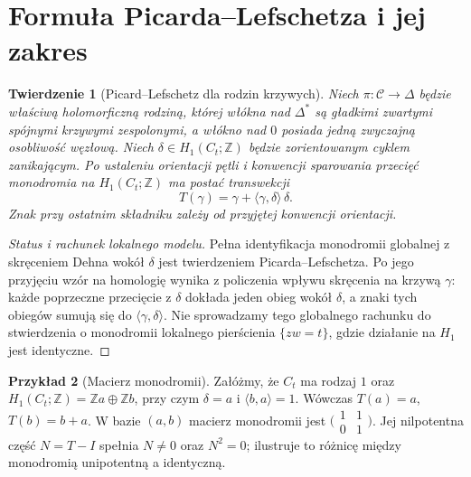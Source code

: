 \documentclass[11pt,a4paper,oneside]{report}
\newcommand{\Z}{\mathbb{Z}}
\theoremstyle{plain}
\newtheorem{twierdzenie}{Twierdzenie}[section]
\theoremstyle{definition}
\newtheorem{przyklad}[twierdzenie]{Przykład}
\theoremstyle{remark}
\begin{document}
\section{Formuła Picarda--Lefschetza i jej zakres}
\begin{twierdzenie}[Picard--Lefschetz dla rodzin krzywych]
\label{thm:picard-lefschetz-xiv}
Niech $\pi:\mathcal C\to\Delta$ będzie właściwą
holomorficzną rodziną, której włókna nad
$\Delta^*$ są gładkimi zwartymi spójnymi
krzywymi zespolonymi, a włókno nad $0$ posiada
jedną zwyczajną osobliwość węzłową.
Niech $\delta\in H_1(C_t;\Z)$ będzie
zorientowanym cyklem zanikającym.
Po ustaleniu orientacji pętli i konwencji
sparowania przecięć monodromia na $H_1(C_t;\Z)$
ma postać transwekcji
\[
T(\gamma)=\gamma+\langle\gamma,\delta\rangle\,\delta.
\]
Znak przy ostatnim składniku zależy od
przyjętej konwencji orientacji.
\end{twierdzenie}
\begin{proof}[Status i rachunek lokalnego modelu]
Pełna identyfikacja monodromii globalnej z
skręceniem Dehna wokół $\delta$ jest twierdzeniem
Picarda--Lefschetza. Po jego przyjęciu wzór na
homologię wynika z policzenia wpływu skręcenia
na krzywą $\gamma$: każde poprzeczne przecięcie
z $\delta$ dokłada jeden obieg wokół $\delta$,
a znaki tych obiegów sumują się do
$\langle\gamma,\delta\rangle$.
Nie sprowadzamy tego globalnego rachunku do
stwierdzenia o monodromii lokalnego pierścienia
$\{zw=t\}$, gdzie działanie na $H_1$ jest identyczne.
\end{proof}
\begin{przyklad}[Macierz monodromii]
Załóżmy, że $C_t$ ma rodzaj $1$ oraz
$H_1(C_t;\Z)=\Z a\oplus\Z b$, przy czym
$\delta=a$ i $\langle b,a\rangle=1$.
Wówczas $T(a)=a$, $T(b)=b+a$.
W bazie $(a,b)$ macierz monodromii jest
$\bigl(\begin{smallmatrix}1&1\\0&1\end{smallmatrix}\bigr)$.
Jej nilpotentna część $N=T-I$ spełnia
$N\ne0$ oraz $N^2=0$; ilustruje to różnicę
między monodromią unipotentną a identyczną.
\end{przyklad}
\end{document}
